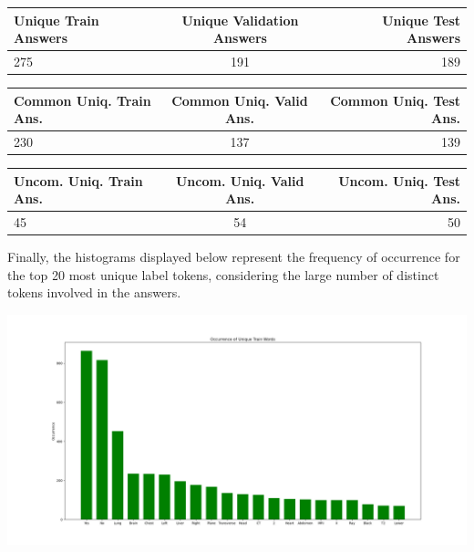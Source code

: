 \documentclass{adonis}
\begin{document}
  \begin{table}[H]
  \centering
  \setlength{\tabcolsep}{0.7em}
  {\renewcommand{\arraystretch}{1.2}
    \begin{minipage}{15.5cm}
  \begin{tabular}{ | l | c | r | }
    \hline
    Unique Train Answers & Unique Validation Answers & Unique Test Answers \\ \hline
    275 & 191 & 189 \\ \hline
\end{tabular}
  \end{minipage}}
  \end{table}


  \begin{table}[H]
  \centering
  \setlength{\tabcolsep}{0.19em}
  {\renewcommand{\arraystretch}{1.2}
    \begin{minipage}{15.5cm}
  \begin{tabular}{ | l | c | r | }
    \hline
    Common Uniq. Train Ans. & Common Uniq. Valid Ans. & Common Uniq. Test Ans. \\ \hline
    230 & 137 & 139 \\ \hline
\end{tabular}
  \end{minipage}}
  \end{table}



  \begin{table}[H]
  \centering
  \setlength{\tabcolsep}{0.5em}
  {\renewcommand{\arraystretch}{1.2}
    \begin{minipage}{15.5cm}
  \begin{tabular}{ | l | c | r | }
    \hline
    Uncom. Uniq. Train Ans. & Uncom. Uniq. Valid Ans. & Uncom. Uniq. Test Ans. \\ \hline
    45 & 54 & 50 \\ \hline
\end{tabular}
  \end{minipage}}
  \end{table}

  
\newpage
\vspace{10pt}
  Finally, the histograms displayed below represent the frequency of occurrence for the top 20 most unique label tokens, considering the large number of distinct tokens involved in the answers.
  
 \begin{center}
       \hspace*{-1.5cm}\includegraphics[width=15cm]{images/train_unique_words.png}
\end{center}
\end{document}
